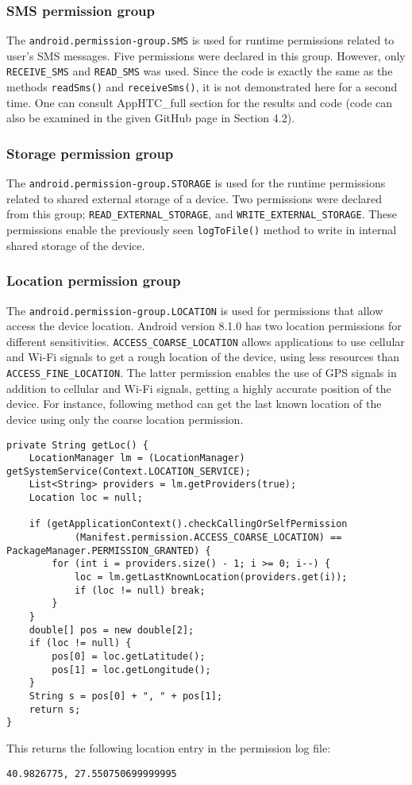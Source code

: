 \documentclass[
  a4paper,  %
  twoside,  %
  bibliography=totoc,
  headsepline,
  cleardoublepage=empty,
  parskip=half,
  draft=false,
  open=any
]{scrbook}
\begin{document}
\subsubsection{SMS permission group}
The \texttt{android.permission-group.SMS} is used for runtime permissions related to user's SMS messages. Five permissions were declared in this group. However, only \texttt{RECEIVE\_SMS} and \texttt{READ\_SMS} was used. Since the code is exactly the same as the methods \texttt{readSms()} and \texttt{receiveSms()}, it is not demonstrated here for a second time. One can consult AppHTC\_full section for the results and code (code can also be examined in the given GitHub page in Section 4.2).

\subsubsection{Storage permission group}
The \texttt{android.permission-group.STORAGE} is used for the runtime permissions related to shared external storage of a device. Two permissions were declared from this group; \texttt{READ\_EXTERNAL\_STORAGE}, and \texttt{WRITE\_EXTERNAL\_STORAGE}. These permissions enable the previously seen \texttt{logToFile()} method to write in internal shared storage of the device. 

\subsubsection{Location permission group}
The \texttt{android.permission-group.LOCATION} is used for permissions that allow access the device location. Android version 8.1.0 has two location permissions for different sensitivities. \texttt{ACCESS\_COARSE\_LOCATION} allows applications to use cellular and Wi-Fi signals to get a rough location of the device, using less resources than \texttt{ACCESS\_FINE\_LOCATION}. The latter permission enables the use of GPS signals in addition to cellular and Wi-Fi signals, getting a highly accurate position of the device. For instance, following method can get the last known location of the device using only the coarse location permission.
\begin{lstlisting}
private String getLoc() {
	LocationManager lm = (LocationManager) getSystemService(Context.LOCATION_SERVICE);
	List<String> providers = lm.getProviders(true);
	Location loc = null;
	
	if (getApplicationContext().checkCallingOrSelfPermission
			(Manifest.permission.ACCESS_COARSE_LOCATION) == PackageManager.PERMISSION_GRANTED) {
		for (int i = providers.size() - 1; i >= 0; i--) {
			loc = lm.getLastKnownLocation(providers.get(i));
			if (loc != null) break;
		}
	}
	double[] pos = new double[2];
	if (loc != null) {
		pos[0] = loc.getLatitude();
		pos[1] = loc.getLongitude();
	}
	String s = pos[0] + ", " + pos[1];
	return s;
}
\end{lstlisting}
This returns the following location entry in the permission log file:
\begin{lstlisting}
40.9826775, 27.550750699999995
\end{lstlisting}
\end{document}
